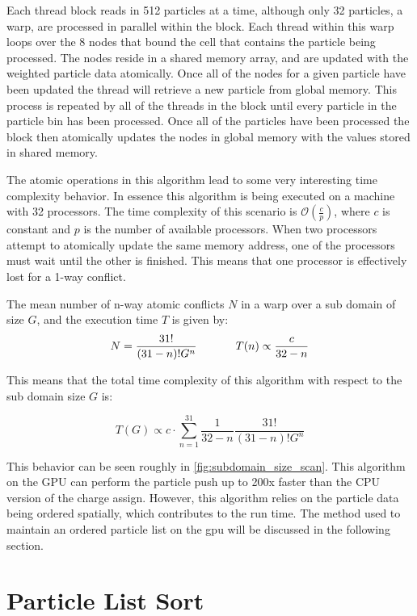 Each thread block reads in 512 particles at a time, although only 32 particles, a warp, are processed in parallel within the block. Each thread within this warp loops over the 8 nodes that bound the cell that contains the particle being processed. The nodes reside in a shared memory array, and are updated with the weighted particle data atomically. Once all of the nodes for a given particle have been updated the thread will retrieve a new particle from global memory. This process is repeated by all of the threads in the block until every particle in the particle bin has been processed. Once all of the particles have been processed the block then atomically updates the nodes in global memory with the values stored in shared memory.  

The atomic operations in this algorithm lead to some very interesting time complexity behavior. In essence this algorithm is being executed on a machine with 32 processors. The time complexity of this scenario is $\mathcal{O}(\frac{c}{p})$, where $c$ is constant and $p$ is the number of available processors. When two processors attempt to atomically update the same memory address, one of the processors must wait until the other is finished. This means that one processor is effectively lost for a 1-way conflict. 

The mean number of n-way atomic conflicts $N$ in a warp over a sub domain of size $G$, and the execution time $T$ is given by:
\begin{equation}
N = \frac{31!}{(31-n)! G^n} \hspace{0.1\textwidth} T(n) \propto \frac{c}{32-n}
\end{equation}

This means that the total time complexity of this algorithm with respect to the sub domain size $G$ is:

\begin{equation}
T(G) \propto c \cdot \sum_{n=1}^{31} \frac{1}{32-n} \frac{31!}{(31-n)! G^n}
\end{equation}

This behavior can be seen roughly in \ref{fig:subdomain_size_scan}. This algorithm on the GPU can perform the particle push up to 200x faster than the CPU version of the charge assign. However, this algorithm relies on the particle data being ordered spatially, which contributes to the run time. The method used to maintain an ordered particle list on the gpu will be discussed in the following section.


	\section{Particle List Sort}
	\label{sec:plist_sort}
	
